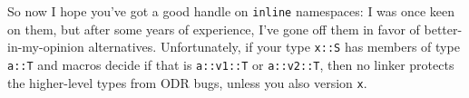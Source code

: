 So now I hope you've got a good handle on \lstinline!inline! namespaces: I
was once keen on them, but after some years of experience, I've gone off
them in favor of better-in-my-opinion alternatives. Unfortunately, if your type \lstinline!x::S! has members of type
\lstinline!a::T! and macros decide if that is \lstinline!a::v1::T! or
\lstinline!a::v2::T!, then no linker protects the higher-level types from
ODR bugs, unless you also version \lstinline!x!.


